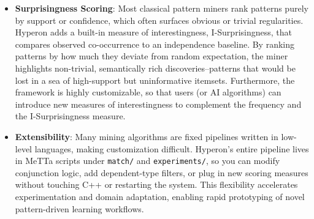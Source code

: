\documentclass{article}
\begin{document}
\begin{itemize}
  \item \textbf{Surprisingness Scoring}:  
    Most classical pattern miners rank patterns purely by support or confidence, which often surfaces obvious or trivial regularities.  Hyperon adds a built-in measure of interestingness, I-Surprisingness, that compares observed co-occurrence to an independence baseline.  By ranking patterns by how much they deviate from random expectation, the miner highlights non-trivial, semantically rich discoveries--patterns that would be lost in a sea of high-support but uninformative itemsets.  Furthermore, the framework is highly customizable, so that users (or AI algorithms) can introduce new measures of interestingness to complement the frequency and the I-Surprisingness measure.

  \item \textbf{Extensibility}:  
    Many mining algorithms are fixed pipelines written in low-level languages, making customization difficult.  Hyperon's entire pipeline lives in MeTTa scripts under \texttt{match/} and \texttt{experiments/}, so you can modify conjunction logic, add dependent-type filters, or plug in new scoring measures without touching C++ or restarting the system.  This flexibility accelerates experimentation and domain adaptation, enabling rapid prototyping of novel pattern-driven learning workflows.
\end{itemize}
\end{document}
